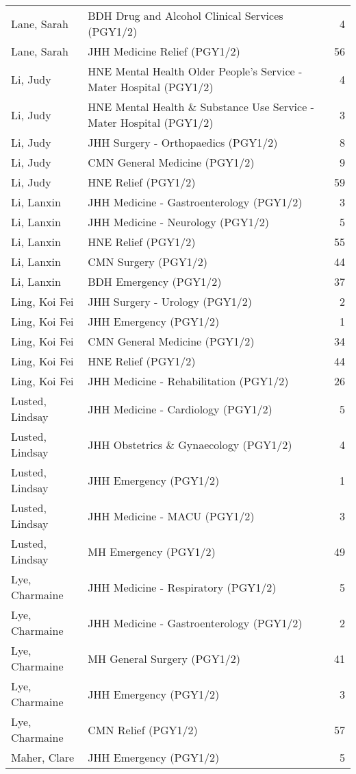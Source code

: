 \documentclass[
]{article}
\begin{document}
\begin{longtable}{llr}
Lane, Sarah & BDH Drug and Alcohol Clinical Services (PGY1/2) & 4 \\ 
Lane, Sarah & JHH Medicine Relief (PGY1/2) & 56 \\ 
Li, Judy & HNE Mental Health Older People's Service - Mater Hospital (PGY1/2) & 4 \\ 
Li, Judy & HNE Mental Health \& Substance Use Service - Mater Hospital (PGY1/2) & 3 \\ 
Li, Judy & JHH Surgery - Orthopaedics (PGY1/2) & 8 \\ 
Li, Judy & CMN General Medicine (PGY1/2) & 9 \\ 
Li, Judy & HNE Relief (PGY1/2) & 59 \\ 
Li, Lanxin & JHH Medicine - Gastroenterology (PGY1/2) & 3 \\ 
Li, Lanxin & JHH Medicine - Neurology (PGY1/2) & 5 \\ 
Li, Lanxin & HNE Relief (PGY1/2) & 55 \\ 
Li, Lanxin & CMN Surgery (PGY1/2) & 44 \\ 
Li, Lanxin & BDH Emergency (PGY1/2) & 37 \\ 
Ling, Koi Fei & JHH Surgery - Urology (PGY1/2) & 2 \\ 
Ling, Koi Fei & JHH Emergency (PGY1/2) & 1 \\ 
Ling, Koi Fei & CMN General Medicine (PGY1/2) & 34 \\ 
Ling, Koi Fei & HNE Relief (PGY1/2) & 44 \\ 
Ling, Koi Fei & JHH Medicine - Rehabilitation (PGY1/2) & 26 \\ 
Lusted, Lindsay & JHH Medicine - Cardiology (PGY1/2) & 5 \\ 
Lusted, Lindsay & JHH Obstetrics \& Gynaecology (PGY1/2) & 4 \\ 
Lusted, Lindsay & JHH Emergency (PGY1/2) & 1 \\ 
Lusted, Lindsay & JHH Medicine - MACU (PGY1/2) & 3 \\ 
Lusted, Lindsay & MH Emergency (PGY1/2) & 49 \\ 
Lye, Charmaine & JHH Medicine - Respiratory (PGY1/2) & 5 \\ 
Lye, Charmaine & JHH Medicine - Gastroenterology (PGY1/2) & 2 \\ 
Lye, Charmaine & MH General Surgery (PGY1/2) & 41 \\ 
Lye, Charmaine & JHH Emergency (PGY1/2) & 3 \\ 
Lye, Charmaine & CMN Relief (PGY1/2) & 57 \\ 
Maher, Clare & JHH Emergency (PGY1/2) & 5 \\ 

\end{longtable}
\end{document}
